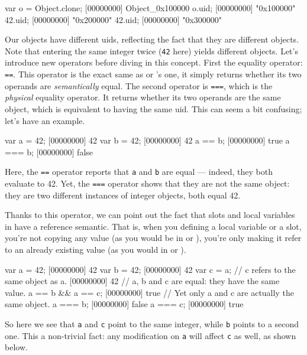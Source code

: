 \begin{urbiscript}
var o = Object.clone;
[00000000] Object_0x100000
o.uid;
[00000000] "0x100000"
42.uid;
[00000000] "0x200000"
42.uid;
[00000000] "0x300000"
\end{urbiscript}

Our objects have different uids, reflecting the fact that they are
different objects. Note that entering the same integer twice
(\lstinline{42} here) yields different objects. Let's introduce new
operators before diving in this concept. First the equality operator:
\lstinline{==}. This operator is the exact same as \C or \Cxx's one,
it simply returns whether its two operands are \emph{semantically}
equal. The second operator is \lstinline{===}, which is the
\emph{physical} equality operator. It returns whether its two operands
are the same object, which is equivalent to having the same uid. This
can seem a bit confusing; let's have an example.

\begin{urbiscript}[firstnumber=last]
var a = 42;
[00000000] 42
var b = 42;
[00000000] 42
a == b;
[00000000] true
a === b;
[00000000] false
\end{urbiscript}

Here, the \lstinline{==} operator reports that \lstinline{a} and
\lstinline{b} are equal ---
indeed, they both evaluate to 42. Yet, the \lstinline{===} operator shows
that they are not the same object: they are two different
instances of integer objects, both equal 42.

Thanks to this operator, we can point out the fact that slots and
local variables in \us have a reference semantic. That is, when you
defining a local variable or a slot, you're not copying any value (as
you would be in \C or \Cxx), you're only making it refer to an already
existing value (as you would in \ruby or \java).

\begin{urbiscript}
var a = 42;
[00000000] 42
var b = 42;
[00000000] 42
var c = a; // c refers to the same object as a.
[00000000] 42
// a, b and c are equal: they have the same value.
a == b && a == c;
[00000000] true
// Yet only a and c are actually the same object.
a === b;
[00000000] false
a === c;
[00000000] true
\end{urbiscript}

So here we see that \lstinline|a| and \lstinline|c| point to the same
integer, while \lstinline|b| points to a second one. This a
non-trivial fact: any modification on \lstinline|a| will affect
\lstinline|c| as well, as shown below.

